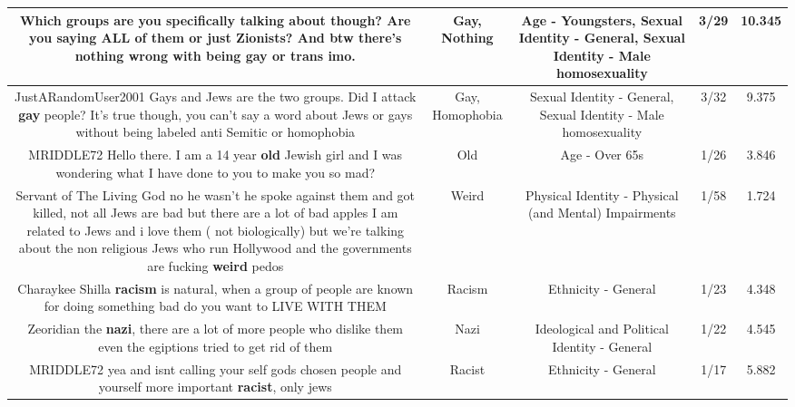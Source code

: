 \documentclass[11pt]{article}
\newlength\mylength
\begin{document}
\begin{center}
\begin{longtable}{|C{.65\mylength}|C{.30\mylength}|C{.12\mylength}|C{.12\mylength}|C{.12\mylength}|}
  \small {} Which groups are you specifically talking about though? Are you saying ALL of them or just Zionists? And btw there's \textbf{nothing} wrong with being \textbf{g\textbf{ay}} or trans imo.\normalsize   & Gay, Nothing & Age - Youngsters, Sexual Identity - General, Sexual Identity - Male homosexuality & 3/29 & 10.345 \\  \hline
  \small JustARandomUser2001 Gays and Jews are the two groups. Did I attack \textbf{g\textbf{ay}} people? It's true though, you can't say a word about Jews or gays without being labeled anti Semitic or homophobia\normalsize   & Gay, Homophobia & Sexual Identity - General, Sexual Identity - Male homosexuality & 3/32 & 9.375 \\  \hline
  \small MRIDDLE72 Hello there. I am a 14 year \textbf{old} Jewish girl and I was wondering what I have done to you to make you so mad?\normalsize   & Old & Age - Over 65s & 1/26 & 3.846 \\  \hline
  \small Servant of The Living God no he wasn't he spoke against them and got killed, not all Jews are bad but there are a lot of bad apples I am related to Jews and i love them ( not biologically) but we're talking about the non religious Jews who run Hollywood and the governments are fucking \textbf{weird} pedos\normalsize   & Weird & Physical Identity - Physical (and Mental) Impairments & 1/58 & 1.724 \\  \hline
  \small Charaykee Shilla \textbf{racism} is natural, when a group of people are known for doing something bad do you want to LIVE WITH THEM\normalsize   & Racism & Ethnicity - General & 1/23 & 4.348 \\  \hline
  \small Zeoridian the \textbf{nazi}, there are a lot of more people who dislike them even the egiptions tried to get rid of them\normalsize   & Nazi &  Ideological and Political Identity - General & 1/22 & 4.545 \\  \hline
  \small MRIDDLE72 yea and isnt calling your self gods chosen people and yourself more important \textbf{racist}, only jews\normalsize   & Racist & Ethnicity - General & 1/17 & 5.882 \\  \hline

\end{longtable}
\end{center}
\end{document}
